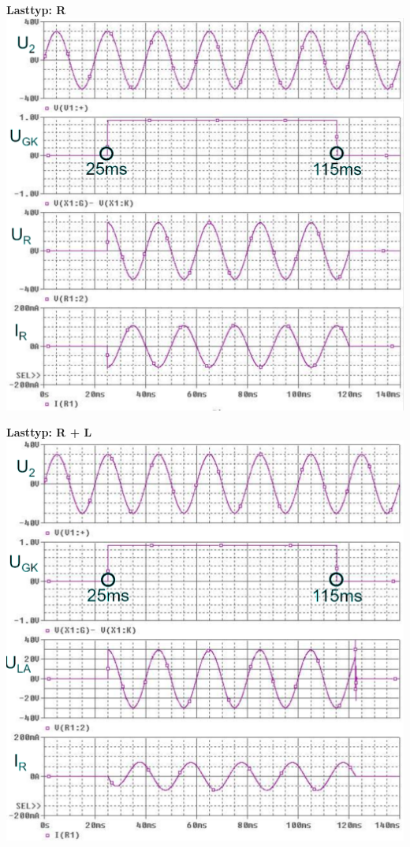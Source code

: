 \begin{minipage}{0.3\linewidth}
    \textbf{Lasttyp: R}\newline
    \includegraphics[width=\linewidth]{images/KLWSSchalter}
\end{minipage}
\begin{minipage}{0.3\linewidth}
    \textbf{Lasttyp: R + L}\newline
    \includegraphics[width=\linewidth]{images/KLWSSchalter2}
\end{minipage}

